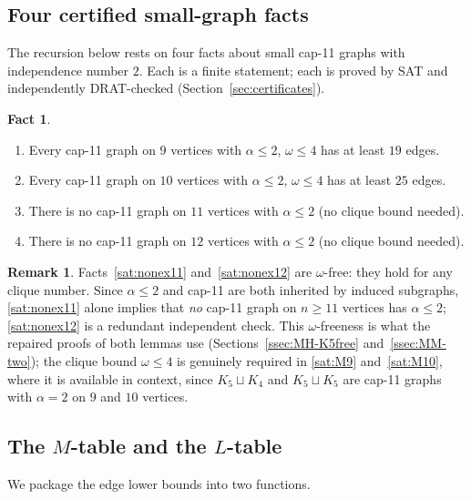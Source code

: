 \documentclass[11pt,reqno]{amsart}
\theoremstyle{definition}
\newtheorem{remark}[theorem]{Remark}
\newtheorem{fact}[theorem]{Fact}
\theoremstyle{remark}
\newcommand{\capeleven}{\textsf{cap-11}}
\begin{document}
\subsection{Four certified small-graph facts}\label{ssec:small}
The recursion below rests on four facts about small \capeleven{} graphs with
independence number $2$. Each is a finite statement; each is proved by SAT and
independently DRAT-checked (Section~\ref{sec:certificates}).

\begin{fact}\label{fact:sat}
\leavevmode
\begin{enumerate}[label=\textup{(M\arabic*)}]
\item\label{sat:M9} Every \capeleven{} graph on $9$ vertices with $\alpha\le 2$,
$\omega\le 4$ has at least $19$ edges.
\item\label{sat:M10} Every \capeleven{} graph on $10$ vertices with $\alpha\le 2$,
$\omega\le 4$ has at least $25$ edges.
\item\label{sat:nonex11} There is no \capeleven{} graph on $11$ vertices with
$\alpha\le 2$ \textup{(no clique bound needed)}.
\item\label{sat:nonex12} There is no \capeleven{} graph on $12$ vertices with
$\alpha\le 2$ \textup{(no clique bound needed)}.
\end{enumerate}
\end{fact}

\begin{remark}\label{rem:nonex-mono}
Facts~\ref{sat:nonex11} and~\ref{sat:nonex12} are $\omega$-free: they hold for any
clique number. Since $\alpha\le 2$ and \capeleven{} are both inherited by induced
subgraphs, \ref{sat:nonex11} alone implies that \emph{no} \capeleven{} graph on
$n\ge 11$ vertices has $\alpha\le 2$; \ref{sat:nonex12} is a redundant independent
check. This $\omega$-freeness is what the repaired proofs of both lemmas use
(Sections~\ref{ssec:MH-K5free} and~\ref{ssec:MM-two}); the clique bound $\omega\le
4$ is genuinely required in \ref{sat:M9} and~\ref{sat:M10}, where it is available
in context, since $K_5\sqcup K_4$ and $K_5\sqcup K_5$ are \capeleven{} graphs with
$\alpha=2$ on $9$ and $10$ vertices.
\end{remark}

\subsection{The $M$-table and the $L$-table}\label{ssec:tables}
We package the edge lower bounds into two functions.
\end{document}
